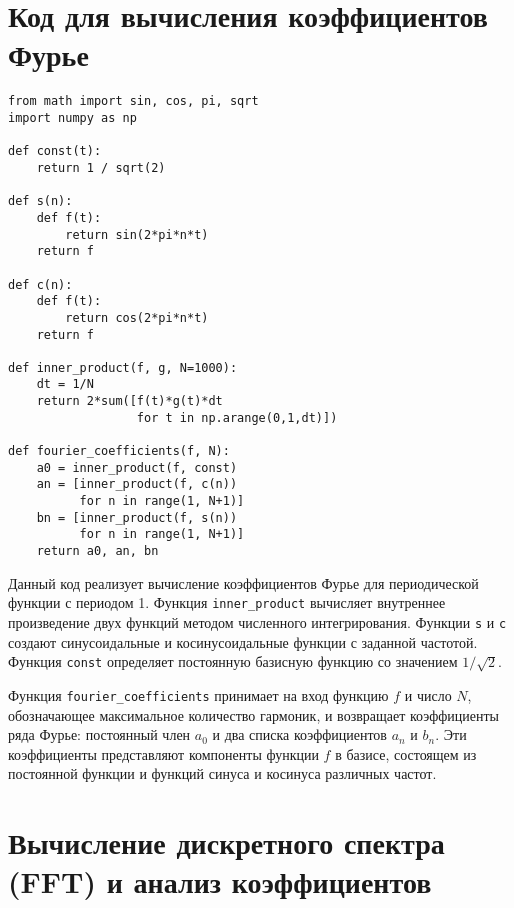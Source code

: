\documentclass[bachelor, och, diploma]{SCWorks}
\begin{document}
\section{Код для вычисления коэффициентов Фурье}

\begin{verbatim}
from math import sin, cos, pi, sqrt
import numpy as np

def const(t):
    return 1 / sqrt(2)

def s(n):
    def f(t):
        return sin(2*pi*n*t)
    return f

def c(n):
    def f(t):
        return cos(2*pi*n*t)
    return f

def inner_product(f, g, N=1000):
    dt = 1/N
    return 2*sum([f(t)*g(t)*dt
                  for t in np.arange(0,1,dt)])

def fourier_coefficients(f, N):
    a0 = inner_product(f, const)
    an = [inner_product(f, c(n))
          for n in range(1, N+1)]
    bn = [inner_product(f, s(n))
          for n in range(1, N+1)]
    return a0, an, bn
\end{verbatim}

Данный код реализует вычисление коэффициентов Фурье для периодической функции с периодом 1. Функция \texttt{inner\_product} вычисляет внутреннее произведение двух функций методом численного интегрирования. Функции \texttt{s} и \texttt{c} создают синусоидальные и косинусоидальные функции с заданной частотой. Функция \texttt{const} определяет постоянную базисную функцию со значением $1/\sqrt{2}$.

Функция \texttt{fourier\_coefficients} принимает на вход функцию $f$ и число $N$, обозначающее максимальное количество гармоник, и возвращает коэффициенты ряда Фурье: постоянный член $a_0$ и два списка коэффициентов $a_n$ и $b_n$. Эти коэффициенты представляют компоненты функции $f$ в базисе, состоящем из постоянной функции и функций синуса и косинуса различных частот.

\section{Вычисление дискретного спектра (FFT) и анализ коэффициентов}
\end{document}
